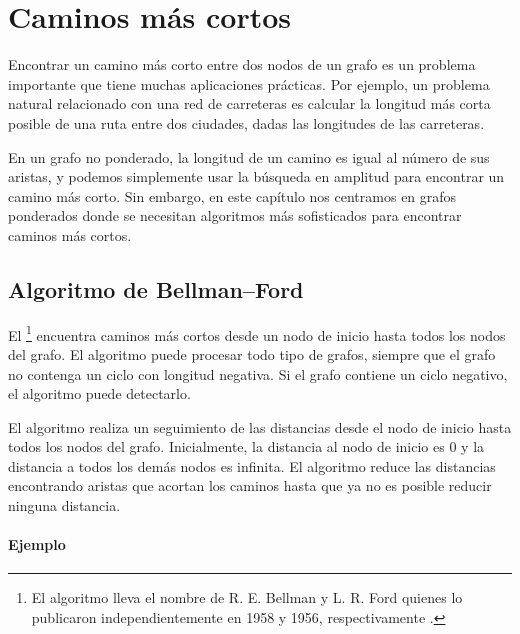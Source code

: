 \chapter{Caminos más cortos}


Encontrar un camino más corto entre dos nodos
de un grafo
es un problema importante que tiene muchas
aplicaciones prácticas.
Por ejemplo, un problema natural relacionado con una red de carreteras
es calcular la longitud más corta posible de una ruta
entre dos ciudades, dadas las longitudes de las carreteras.

En un grafo no ponderado, la longitud de un camino es igual
al número de sus aristas, y podemos
simplemente usar la búsqueda en amplitud para encontrar
un camino más corto.
Sin embargo, en este capítulo nos centramos en
grafos ponderados
donde se necesitan algoritmos más sofisticados
para encontrar caminos más cortos.

\section{Algoritmo de Bellman–Ford}


El \footnote{El algoritmo lleva el nombre de
R. E. Bellman y L. R. Ford quienes lo publicaron independientemente
en 1958 y 1956, respectivamente \cite{bel58,for56a}.} encuentra
caminos más cortos desde un nodo de inicio hasta todos
los nodos del grafo.
El algoritmo puede procesar todo tipo de grafos,
siempre que el grafo no contenga un
ciclo con longitud negativa.
Si el grafo contiene un ciclo negativo,
el algoritmo puede detectarlo.

El algoritmo realiza un seguimiento de las distancias
desde el nodo de inicio hasta todos los nodos del grafo.
Inicialmente, la distancia al nodo de inicio es 0
y la distancia a todos los demás nodos es infinita.
El algoritmo reduce las distancias encontrando
aristas que acortan los caminos hasta que ya no es
posible reducir ninguna distancia.

\subsubsection{Ejemplo}

